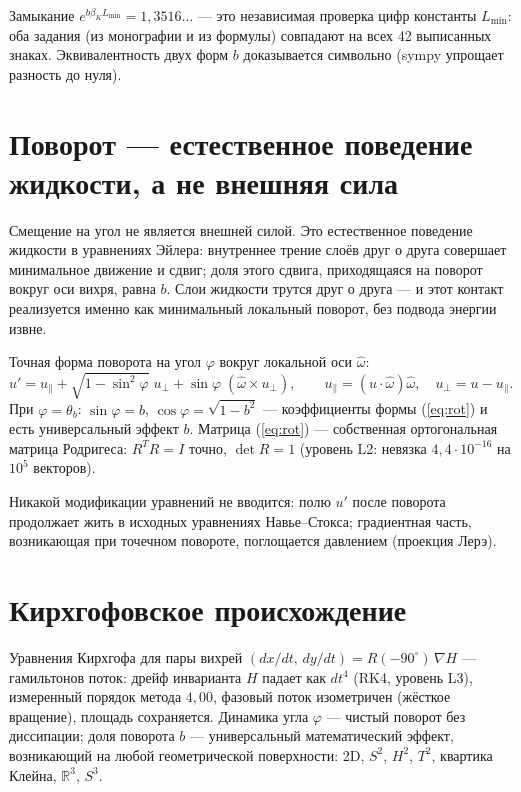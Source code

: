 \documentclass[12pt]{article}
\begin{document}
Замыкание $e^{b\beta_K L_{\min}}=1{,}3516\ldots$ --- это независимая проверка цифр
константы $L_{\min}$: оба задания (из монографии и из формулы) совпадают на всех 42
выписанных знаках. Эквивалентность двух форм $b$ доказывается символьно (sympy
упрощает разность до нуля).

\section{Поворот --- естественное поведение жидкости, а не внешняя сила}

Смещение на угол не является внешней силой. Это естественное поведение жидкости
в уравнениях Эйлера: внутреннее трение слоёв друг о друга совершает минимальное
движение и сдвиг; доля этого сдвига, приходящаяся на поворот вокруг оси вихря,
равна $b$. Слои жидкости трутся друг о друга --- и этот контакт реализуется именно
как минимальный локальный поворот, без подвода энергии извне.

Точная форма поворота на угол $\varphi$ вокруг локальной оси $\hat\omega$:
\begin{equation}
u'=u_{\parallel}+\sqrt{1-\sin^{2}\varphi}\;u_{\perp}+\sin\varphi\;(\hat\omega\times u_{\perp}),
\qquad u_{\parallel}=(u\cdot\hat\omega)\hat\omega,\quad u_{\perp}=u-u_{\parallel}.
\label{eq:rot}
\end{equation}
При $\varphi=\theta_b$: $\sin\varphi=b$, $\cos\varphi=\sqrt{1-b^{2}}$ --- коэффициенты
формы (\ref{eq:rot}) и есть универсальный эффект $b$. Матрица (\ref{eq:rot}) ---
собственная ортогональная матрица Родригеса: $R^{T}R=I$ точно, $\det R=1$
(уровень L2: невязка $4{,}4\cdot10^{-16}$ на $10^{5}$ векторов).

Никакой модификации уравнений не вводится: полю $u'$ после поворота
продолжает жить в исходных уравнениях Навье--Стокса; градиентная часть,
возникающая при точечном повороте, поглощается давлением (проекция Лерэ).

\section{Кирхгофовское происхождение}

Уравнения Кирхгофа для пары вихрей
$(dx/dt,\,dy/dt)=R(-90^\circ)\,\nabla H$ --- гамильтонов поток: дрейф инварианта
$H$ падает как $dt^{4}$ (RK4, уровень L3), измеренный порядок метода $4{,}00$,
фазовый поток изометричен (жёсткое вращение), площадь сохраняется. Динамика
угла $\varphi$ --- чистый поворот без диссипации; доля поворота $b$ ---
универсальный математический эффект, возникающий на любой геометрической
поверхности: 2D, $S^{2}$, $H^{2}$, $T^{2}$, квартика Клейна, $\mathbb{R}^{3}$,
$S^{3}$.
\end{document}
